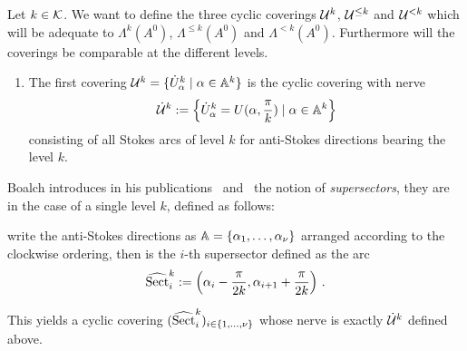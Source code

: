 Let $k\in\mathcal{K}$.
We want to define the three cyclic coverings $\mathcal{U}^{k}$, $\mathcal{U}^{\leq k}$ and
$\mathcal{U}^{<k}$ which will be adequate to $\Lambda^k(A^0)$, $\Lambda^{\leq k}(A^0)$
and $\Lambda^{<k}(A^0)$. Furthermore will the coverings be comparable at the
different levels.

\begin{enumerate}
  \item The first covering $\mathcal{U}^{k}=\{\dot U_\alpha^k\mid\alpha\in\mathbb{A}^k\}$
    is the cyclic covering with nerve
    \[
      \dot{\mathcal{U}}^k:=
      \left\{\dot U_\alpha^k=U(\alpha,\frac{\pi}{k})\mid\alpha\in\mathbb{A}^k\right\}
    \]
    consisting of all Stokes arcs of level $k$ for anti-Stokes directions
    bearing the level $k$.
\end{enumerate}

\begin{rem}\label{rem:superSectors}
  Boalch introduces in his publications~\cite[19]{boalch}
  and~\cite[Def.1.23]{thboalch} the notion of \emph{supersectors}, they are in
  the case of a single level $k$, defined as follows:
  \begin{einr}
    write the anti-Stokes directions as $\mathbb{A}=\{\alpha_1,\dots,\alpha_\nu\}$
    arranged according to the clockwise ordering, then is the $i$-th
    supersector defined as the arc
    \[
      \widehat{\operatorname{Sect}}^k_i:=
        \left(\alpha_i-\frac{\pi}{2k},\alpha_{i+1}+\frac{\pi}{2k}\right) \,.
    \]
  \end{einr}
  This yields a cyclic covering $(\widehat{\operatorname{Sect}}^k_i)_{i\in\{1,\dots,\nu\}}$ whose
  nerve is exactly $\dot{\mathcal{U}}^k$ defined above.
  \begin{comment}
    \begin{center}
      \begin{tikzpicture}[scale=3]
        \node[] (zero) at (0,0) {};
        \draw[blue] (zero) circle (1cm);

        \fill[fill=green!20!white] (0,0) -- ({cos( 15 )},{sin( 15 )}) arc
          (15:85:1) -- cycle;

        \fill[fill=red!60!black] (0,0) -- ({cos( 15 )*0.5},{sin( 15 )*0.5}) arc
          (15:45:0.5) -- cycle;
        \fill[fill=red!60!black] (0,0) -- ({cos( 55 )*0.5},{sin( 55 )*0.5}) arc
          (55:85:0.5) -- cycle;

        \fill[fill=green!20!white] (0,0) -- ({cos( 15 )*0.4},{sin( 15 )*0.4}) arc
          (15:85:0.4) -- cycle;

        \node[green!40!black] at (1,1) {$\widehat\Sect_i$};

        \node[] (lft) at ({cos( 85 )},{sin( 85 )}) {};
        \node[] (rgt) at ({cos( 15 )},{sin( 15 )}) {};


\end{comment}
\end{rem}
